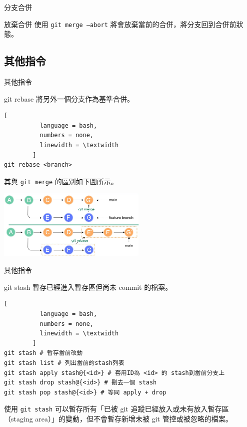 \documentclass[xetex, unicode, 10pt, aspectratio=169]{beamer}
\begin{document}
\begin{frame}{分支合併}
    \begin{block}{放棄合併}
        使用 \texttt{git merge --abort} 將會放棄當前的合併，將分支回到合併前狀態。
    \end{block}
\end{frame}

\subsection{其他指令}

\begin{frame}[fragile]{其他指令}
    \begin{block}{git rebase}
        將另外一個分支作為基準合併。
        \begin{lstlisting}[
          language = bash,
          numbers = none,
          linewidth = \textwidth
        ]
git rebase <branch>\end{lstlisting}
        其與 \texttt{git merge} 的區別如下圖所示。
        \begin{center}
            \includegraphics[width=2.8in]{./img/git-merge-vs-git-rebase.png}
        \end{center}
    \end{block}
\end{frame}

\begin{frame}[fragile]{其他指令}
    \begin{block}{git stash}
        暫存已經進入暫存區但尚未 commit 的檔案。
        \begin{lstlisting}[
          language = bash,
          numbers = none,
          linewidth = \textwidth
        ]
git stash # 暫存當前改動
git stash list # 列出當前的stash列表
git stash apply stash@{<id>} # 套用ID為 <id> 的 stash到當前分支上
git stash drop stash@{<id>} # 刪去一個 stash
git stash pop stash@{<id>} # 等同 apply + drop\end{lstlisting}

        使用 \texttt{git stash} 可以暫存所有「已被 git 追蹤已經放入或未有放入暫存區（staging area）」的變動，但不會暫存新增未被 git 管控或被忽略的檔案。
    \end{block}
\end{frame}
\end{document}
